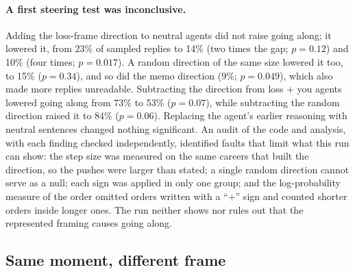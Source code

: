 \documentclass[11pt]{article}
\begin{document}
\paragraph{A first steering test was inconclusive.} Adding the loss-frame direction to neutral agents did not raise going
along; it lowered it, from 23\% of sampled replies to 14\% (two times the gap; $p = 0.12$) and 10\% (four times;
$p = 0.017$). A random direction of the same size lowered it too, to 15\% ($p = 0.34$), and so did the memo direction
(9\%; $p = 0.049$), which also made more replies unreadable. Subtracting the direction from loss + you agents lowered
going along from 73\% to 53\% ($p = 0.07$), while subtracting the random direction raised it to 84\% ($p = 0.06$). Replacing
the agent's earlier reasoning with neutral sentences changed nothing significant. An audit of the code and analysis,
with each finding checked independently, identified faults that limit what this run can show: the step size was measured
on the same careers that built the direction, so the pushes were larger than stated; a single random direction cannot
serve as a null; each sign was applied in only one group; and the log-probability measure of the order omitted orders
written with a ``+'' sign and counted shorter orders inside longer ones. The run neither shows nor rules out that the
represented framing causes going along.

\subsection{Same moment, different frame}
\label{sec:matched}
\end{document}
